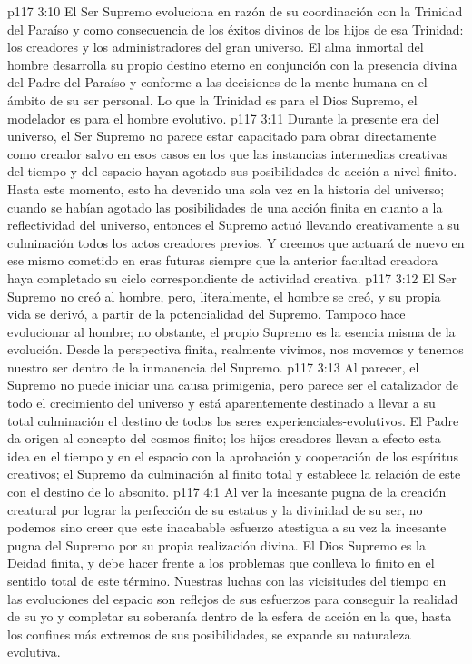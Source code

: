 \vs p117 3:10 El Ser Supremo evoluciona en razón de su coordinación con la Trinidad del Paraíso y como consecuencia de los éxitos divinos de los hijos de esa Trinidad: los creadores y los administradores del gran universo. El alma inmortal del hombre desarrolla su propio destino eterno en conjunción con la presencia divina del Padre del Paraíso y conforme a las decisiones de la mente humana en el ámbito de su ser personal. Lo que la Trinidad es para el Dios Supremo, el modelador es para el hombre evolutivo.
\vs p117 3:11 \pc Durante la presente era del universo, el Ser Supremo no parece estar capacitado para obrar directamente como creador salvo en esos casos en los que las instancias intermedias creativas del tiempo y del espacio hayan agotado sus posibilidades de acción a nivel finito. Hasta este momento, esto ha devenido una sola vez en la historia del universo; cuando se habían agotado las posibilidades de una acción finita en cuanto a la reflectividad del universo, entonces el Supremo actuó llevando creativamente a su culminación todos los actos creadores previos. Y creemos que actuará de nuevo en ese mismo cometido en eras futuras siempre que la anterior facultad creadora haya completado su ciclo correspondiente de actividad creativa.
\vs p117 3:12 El Ser Supremo no creó al hombre, pero, literalmente, el hombre se creó, y su propia vida se derivó, a partir de la potencialidad del Supremo. Tampoco hace evolucionar al hombre; no obstante, el propio Supremo es la esencia misma de la evolución. Desde la perspectiva finita, realmente vivimos, nos movemos y tenemos nuestro ser dentro de la inmanencia del Supremo.
\vs p117 3:13 Al parecer, el Supremo no puede iniciar una causa primigenia, pero parece ser el catalizador de todo el crecimiento del universo y está aparentemente destinado a llevar a su total culminación el destino de todos los seres experienciales\hyp{}evolutivos. El Padre da origen al concepto del cosmos finito; los hijos creadores llevan a efecto esta idea en el tiempo y en el espacio con la aprobación y cooperación de los espíritus creativos; el Supremo da culminación al finito total y establece la relación de este con el destino de lo absonito.
\vs p117 4:1 Al ver la incesante pugna de la creación creatural por lograr la perfección de su estatus y la divinidad de su ser, no podemos sino creer que este inacabable esfuerzo atestigua a su vez la incesante pugna del Supremo por su propia realización divina. El Dios Supremo es la Deidad finita, y debe hacer frente a los problemas que conlleva lo finito en el sentido total de este término. Nuestras luchas con las vicisitudes del tiempo en las evoluciones del espacio son reflejos de sus esfuerzos para conseguir la realidad de su yo y completar su soberanía dentro de la esfera de acción en la que, hasta los confines más extremos de sus posibilidades, se expande su naturaleza evolutiva.
